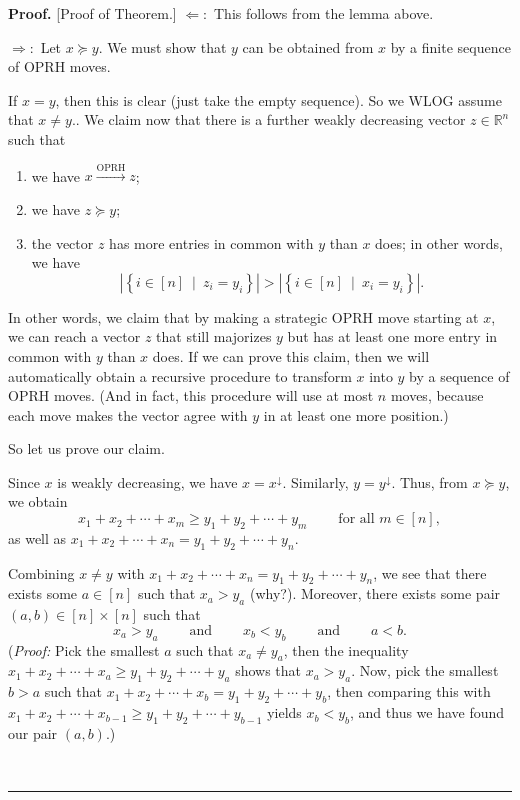 \documentclass[numbers=enddot,12pt,final,onecolumn,notitlepage]{scrartcl}%
\numberwithin{exer}{subsection}
\theoremstyle{definition}
\newenvironment{proof}[1][Proof]{\noindent\textbf{#1.} }{\ \rule{0.5em}{0.5em}}
\begin{document}
\begin{proof}
[Proof of Theorem.] $\Longleftarrow:$ This follows from the lemma above.

$\Longrightarrow:$ Let $x\succcurlyeq y$. We must show that $y$ can be
obtained from $x$ by a finite sequence of OPRH moves.

If $x=y$, then this is clear (just take the empty sequence). So we WLOG assume
that $x\neq y$.. We claim now that there is a further weakly decreasing vector
$z\in\mathbb{R}^{n}$ such that

\begin{enumerate}
\item we have $x\overset{\text{OPRH}}{\longrightarrow}z$;

\item we have $z\succcurlyeq y$;

\item the vector $z$ has more entries in common with $y$ than $x$ does; in
other words, we have%
\[
\left\vert \left\{  i\in\left[  n\right]  \ \mid\ z_{i}=y_{i}\right\}
\right\vert >\left\vert \left\{  i\in\left[  n\right]  \ \mid\ x_{i}%
=y_{i}\right\}  \right\vert .
\]

\end{enumerate}

In other words, we claim that by making a strategic OPRH move starting at $x$,
we can reach a vector $z$ that still majorizes $y$ but has at least one more
entry in common with $y$ than $x$ does. If we can prove this claim, then we
will automatically obtain a recursive procedure to transform $x$ into $y$ by a
sequence of OPRH moves. (And in fact, this procedure will use at most $n$
moves, because each move makes the vector agree with $y$ in at least one more position.)

So let us prove our claim.

Since $x$ is weakly decreasing, we have $x=x^{\downarrow}$. Similarly,
$y=y^{\downarrow}$. Thus, from $x\succcurlyeq y$, we obtain%
\[
x_{1}+x_{2}+\cdots+x_{m}\geq y_{1}+y_{2}+\cdots+y_{m}%
\ \ \ \ \ \ \ \ \ \ \text{for all }m\in\left[  n\right]  ,
\]
as well as $x_{1}+x_{2}+\cdots+x_{n}=y_{1}+y_{2}+\cdots+y_{n}$.

Combining $x\neq y$ with $x_{1}+x_{2}+\cdots+x_{n}=y_{1}+y_{2}+\cdots+y_{n}$,
we see that there exists some $a\in\left[  n\right]  $ such that $x_{a}>y_{a}$
(why?). Moreover, there exists some pair $\left(  a,b\right)  \in\left[
n\right]  \times\left[  n\right]  $ such that
\[
x_{a}>y_{a}\ \ \ \ \ \ \ \ \ \ \text{and}\ \ \ \ \ \ \ \ \ \ x_{b}%
<y_{b}\ \ \ \ \ \ \ \ \ \ \text{and}\ \ \ \ \ \ \ \ \ \ a<b.
\]
(\textit{Proof:} Pick the smallest $a$ such that $x_{a}\neq y_{a}$, then the
inequality $x_{1}+x_{2}+\cdots+x_{a}\geq y_{1}+y_{2}+\cdots+y_{a}$ shows that
$x_{a}>y_{a}$. Now, pick the smallest $b>a$ such that $x_{1}+x_{2}%
+\cdots+x_{b}=y_{1}+y_{2}+\cdots+y_{b}$, then comparing this with $x_{1}%
+x_{2}+\cdots+x_{b-1}\geq y_{1}+y_{2}+\cdots+y_{b-1}$ yields $x_{b}<y_{b}$,
and thus we have found our pair $\left(  a,b\right)  $.)


\end{proof}
\end{document}
